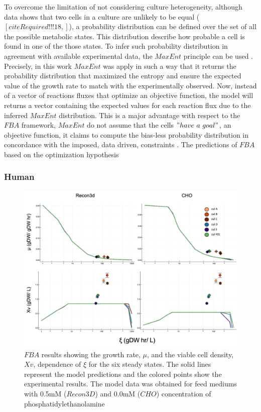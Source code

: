 	To overcome the limitation of not considering culture heterogeneity, although data shows that two cells in a culture are unlikely to be equal ($[citeRequired!!!18, ]$), a probability distribution can be defined over the set of all the possible metabolic states.
	This distribution describe how probable a cell is found in one of the those states.
	To infer such probability distribution in agreement with available experimental data, the $MaxEnt$ principle can be used  . 
	Precisely, in this work $MaxEnt$ was apply in such a way that it returns the probability distribution that maximized the entropy and ensure the expected value of the growth rate to match with the experimentally observed.
	Now, instead of a vector of reactions fluxes that optimize an objective function, the model will returns a vector containing the expected values for each reaction flux due to the inferred $MaxEnt$ distribution. 
	This is a major advantage with respect to the $FBA$ framework, $MaxEnt$ do not assume that the cells $"have\ a\ goal"$, an objective function, it claims to compute the bias-less probability distribution in concordance with the imposed, data driven, constraints . 
	The predictions of $FBA$ based on the optimization hypothesis 
	
	
	\subsubsection{Human}
	
		 	\begin{figure}[H]
		 	\includegraphics[scale = 0.5]{low_medium_1}
		 	\caption{$FBA$ results showing the growth rate, $\mu$, and the viable cell density, $Xv$, dependence of $\xi$ for the six steady states. The solid lines represent the model predictions and the colored points show the experimental results. The model data was obtained for feed mediums with 0.5mM ($Recon3D$) and 0.0mM ($CHO$) concentration of phosphatidylethanolamine}
		 	
		 \end{figure}
		
		
%  	
%	